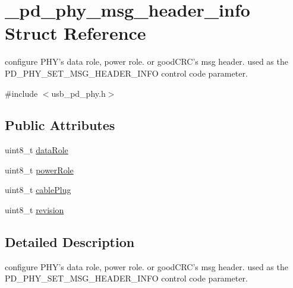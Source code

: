 \hypertarget{struct__pd__phy__msg__header__info}{\section{\-\_\-pd\-\_\-phy\-\_\-msg\-\_\-header\-\_\-info Struct Reference}
\label{struct__pd__phy__msg__header__info}
}


configure P\-H\-Y's data role, power role. or good\-C\-R\-C's msg header. used as the P\-D\-\_\-\-P\-H\-Y\-\_\-\-S\-E\-T\-\_\-\-M\-S\-G\-\_\-\-H\-E\-A\-D\-E\-R\-\_\-\-I\-N\-F\-O control code parameter.  




{\ttfamily \#include $<$usb\-\_\-pd\-\_\-phy.\-h$>$}

\subsection*{Public Attributes}
\begin{DoxyCompactItemize}
\item 
uint8\-\_\-t \hyperlink{struct__pd__phy__msg__header__info_a7f921ee0d685a1f6818dce56ee1ef8f2}{data\-Role}
\item 
uint8\-\_\-t \hyperlink{struct__pd__phy__msg__header__info_a11c74e61a0e7ab66caf6c73321d9d016}{power\-Role}
\item 
uint8\-\_\-t \hyperlink{struct__pd__phy__msg__header__info_a068ae6e534efaaa108dbd0aa75256a63}{cable\-Plug}
\item 
uint8\-\_\-t \hyperlink{struct__pd__phy__msg__header__info_a64122118bd2c482eea1b178b459e1aae}{revision}
\end{DoxyCompactItemize}


\subsection{Detailed Description}
configure P\-H\-Y's data role, power role. or good\-C\-R\-C's msg header. used as the P\-D\-\_\-\-P\-H\-Y\-\_\-\-S\-E\-T\-\_\-\-M\-S\-G\-\_\-\-H\-E\-A\-D\-E\-R\-\_\-\-I\-N\-F\-O control code parameter. 

